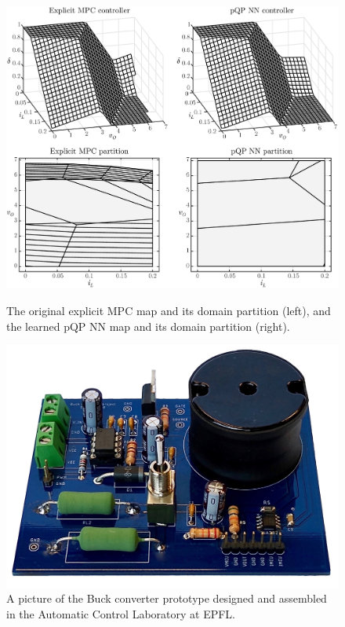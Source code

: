 \begin{figure}[!t]
	\centering
	\vspace{20pt}
	\includegraphics[scale=0.37]{../images/chap4_approx_results.pdf}
	\caption{The original explicit MPC map and its domain partition (left), and the learned pQP NN map and its domain partition (right).}
	\label{fig.approx_results}
	\vspace{22pt}
	\includegraphics[width=0.66\linewidth]{../images/chap4_buck}
	\caption{A picture of the Buck converter prototype designed and assembled in the Automatic Control Laboratory at EPFL.}
	\label{fig.prototype}
\end{figure}

